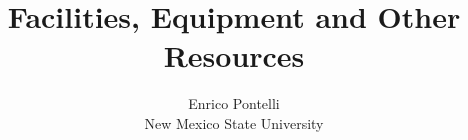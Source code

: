 \documentclass[11pt]{article}
\begin{document}
\title{Facilities, Equipment and Other Resources}
\author{Enrico Pontelli\\New Mexico State University}
\date{}

\maketitle
\end{document}
